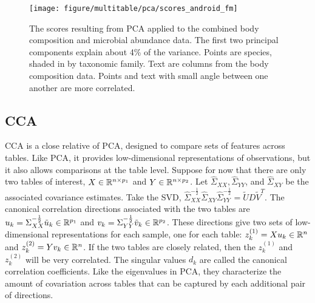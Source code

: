 \documentclass[utf8]{frontiersFPHY} %
\begin{document}
\begin{figure}
  \centering
  \texttt{[image: figure/multitable/pca/scores\_android\_fm]}
  \caption{The scores resulting from PCA applied to the combined body
    composition and microbial abundance data. The first two principal components
    explain about 4\% of the variance. Points are species, shaded in by
    taxonomic family. Text are columns from the body composition data. Points
    and text with small angle between one another are more correlated.
    \label{fig:scores_android_fm} }
\end{figure}

\subsection{CCA}
\label{subsec:cca}

CCA is a close relative of PCA, designed to compare sets of features across
tables. Like PCA, it provides low-dimensional representations of observations,
but it also allows comparisons at the table level. Suppose for now that there
are only two tables of interest, $X \in \mathbb{R}^{n \times p_{1}}$ and $Y \in
\mathbb{R}^{n \times p_{2}}$. Let $\hat{\Sigma}_{XX}, \hat{\Sigma}_{YY}$, and
$\hat{\Sigma}_{XY}$ be the associated covariance estimates. Take the SVD,
$\hat{\Sigma}_{XX}^{-\frac{1}{2}}\hat{\Sigma}_{XY}\hat{\Sigma}_{YY}^{-\frac{1}{2}}
= \tilde{U}D\tilde{V}^{T}$. The canonical correlation directions associated with
the two tables are $u_{k} = \Sigma_{XX}^{-\frac{1}{2}}\tilde{u}_{k} \in
\mathbb{R}^{p_{1}}$ and $v_{k} = \Sigma_{YY}^{-\frac{1}{2}}\tilde{v}_{k} \in
\mathbb{R}^{p_{2}}$. These directions give two sets of low-dimensional
representations for each sample, one for each table: $z_{k}^{(1)} = Xu_{k} \in
\mathbb{R}^{n}$ and $z_{k}^{(2)} = Yv_{k} \in \mathbb{R}^{n}$. If the two tables are
closely related, then the $z_{k}^{(1)}$ and $z_{k}^{(2)}$ will be very
correlated. The singular values $d_{k}$ are called the canonical correlation
coefficients. Like the eigenvalues in PCA, they characterize the amount of
covariation across tables that can be captured by each additional pair of
directions.
\end{document}
